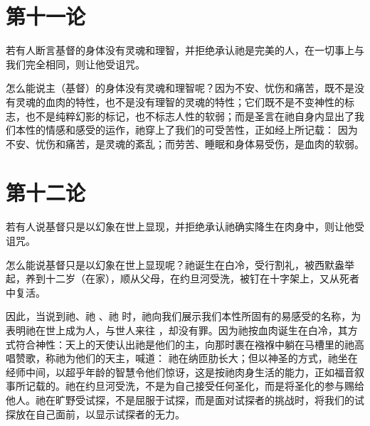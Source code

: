 
\section{第十一论}

若有人断言基督的身体没有灵魂和理智，并拒绝承认祂是完美的人，在一切事上与我们完全相同，则让他受诅咒。\par

\par

怎么能说主（基督）的身体没有灵魂和理智呢？因为不安、忧伤和痛苦，既不是没有灵魂的血肉的特性，也不是没有理智的灵魂的特性；它们既不是不变神性的标志，也不是纯粹幻影的标记，也不标志人性的软弱；而是圣言在祂自身内显出了我们本性的情感和感受的运作，祂穿上了我们的可受苦性，正如经上所记载：  因为不安、忧伤和痛苦，是灵魂的紊乱；而劳苦、睡眠和身体易受伤，是血肉的软弱。\par


\section{第十二论}

若有人说基督只是以幻象在世上显现，并拒绝承认祂确实降生在肉身中，则让他受诅咒。\par

\par

怎么能说基督只是以幻象在世上显现呢？祂诞生在白冷，受行割礼，被西默盎举起，养到十二岁（在家），顺从父母，在约旦河受洗，被钉在十字架上，又从死者中复活。\par

因此，当说到祂、祂 、祂  时，祂向我们展示我们本性所固有的易感受的名称，为表明祂在世上成为人，与世人来往 ，却没有罪。因为祂按血肉诞生在白冷，其方式符合神性：天上的天使认出祂是他们的主，向那时裹在襁褓中躺在马槽里的祂高唱赞歌，称祂为他们的天主，喊道：  祂在纳匝肋长大；但以神圣的方式，祂坐在经师中间，以超乎年龄的智慧令他们惊讶，这是按祂肉身生活的能力，正如福音叙事所记载的。祂在约旦河受洗，不是为自己接受任何圣化，而是将圣化的参与赐给他人。祂在旷野受试探，不是屈服于试探，而是面对试探者的挑战时，将我们的试探放在自己面前，以显示试探者的无力。\par

